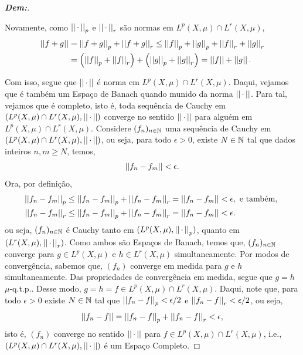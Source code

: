 \begin{proof}[\textbf{Dem:}]
\begin{itemize}
    Novamente, como $\pnorm p {\, \cdot \,}$ e 
    $\pnorm r {\, \cdot \,}$ são normas em $L^p(X, \mu) \cap L^r(X, \mu)$, 
    \begin{align*}
      \snorm {f+g} &= \pnorm p {f + g} + \pnorm r {f + g} \le 
      \pnorm p f + \pnorm p g + \pnorm r f + \pnorm r g \\ 
      &= \parth{\pnorm p f + \pnorm r f} + \parth{\pnorm p g + \pnorm r g}
      = \snorm f + \snorm g. 
    \end{align*}
\end{itemize}
  Com isso, segue que $\snorm {\, \cdot \,}$ é norma em $L^p(X, \mu) \cap L^r(X, \mu)$.
  Daqui, vejamos que é também um Espaço de Banach quando munido da norma $\snorm {\, 
  \cdot \,}$. Para tal, vejamos que é completo, isto é, toda sequência 
  de Cauchy em $(L^p(X, \mu) \cap L^r(X, \mu), \snorm {\, \cdot \,})$ converge 
  no sentido $\snorm {\, \cdot \,}$ para alguém em $L^p(X, \mu) \cap L^r(X, \mu)$.
  Considere $(f_n)_{n \in \bN}$ uma sequência de Cauchy em $(L^p(X, \mu) \cap L^r(X, \mu), \snorm {\, \cdot \,})$, 
  ou seja, para todo $\epsilon > 0$, existe $N \in \bN$ tal que dados inteiros $n, m \ge N$, temos,
  \begin{align*}
    \snorm{f_n - f_m} < \epsilon.
  \end{align*}
  Ora, por definição, 
  \begin{align*}
    \pnorm p {f_n - f_m} &\le \pnorm p {f_n - f_m} + \pnorm r {f_n - f_m}  = \snorm {f_n - f_m} < \epsilon, \text{ e também, } \\
    \pnorm r {f_n - f_m} &\le \pnorm p {f_n - f_m}  + \pnorm r {f_n - f_m} = \snorm {f_n - f_m} < \epsilon.
  \end{align*}
  ou seja, $(f_n)_{n \in \bN}$ é Cauchy tanto em $(L^p(X, \mu), \pnorm p {\, \cdot \,})$, quanto 
  em $(L^r(X, \mu), \pnorm r {\, \cdot \,})$. Como ambos são Espaços de Banach, temos que, 
  $(f_n)_{n \in \bN}$ converge para $g \in L^p(X, \mu)$ e $h \in L^r(X, \mu)$  
  simultaneamente. Por modos de convergência,
  sabemos que, $(f_n)$ converge em medida 
  para $g$ e $h$ simultaneamente. Das propriedades de convergência em medida, 
  segue que $g = h$ $\mu$-q.t.p.. Desse modo, $g = h = f \in L^p(X, \mu)\cap L^r(X, \mu)$.
  Daqui, note que, para todo $\epsilon > 0$ existe $N \in \bN$ tal que 
  $\pnorm p {f_n - f} < \epsilon/2$ e $\pnorm r {f_n - f}< \epsilon /2 $, ou seja,
  \begin{align*}
    \snorm {f_n - f} = \pnorm p {f_n - f} + \pnorm r {f_n - f} < \epsilon,
  \end{align*}
  isto é, $(f_n)$ converge no sentido $\snorm {\, \cdot \,}$ para 
  $f \in L^p(X, \mu) \cap L^r(X, \mu)$, i.e., 
  $(L^p(X, \mu)\cap L^r(X, \mu), \snorm {\, \cdot \,})$ 
  é um Espaço Completo.
\end{proof}

